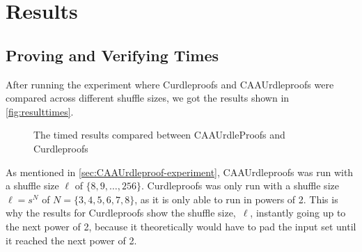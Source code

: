 \section{Results}\label{sec:results}
\subsection{Proving and Verifying Times}\label{subsec:results:provingverifying}

After running the experiment where Curdleproofs and CAAUrdleproofs were compared across different shuffle sizes, we got the results shown in \autoref{fig:resulttimes}.

\begin{figure}[!htb]
    \centering
    \qquad
    \caption{The timed results compared between CAAUrdleProofs and Curdleproofs}%
    \label{fig:resulttimes}%
\end{figure}

As mentioned in \autoref{sec:CAAUrdleproof-experiment}, CAAUrdleproofs was run with a shuffle size $\ell$ of $\{8,9,\dots,256\}$.
Curdleproofs was only run with a shuffle size $\ell = s^N$ of $N = \{3,4,5,6,7,8\}$, as it is only able to run in powers of 2.
This is why the results for Curdleproofs show the shuffle size,~$\ell$, instantly going up to the next power of 2, because it theoretically would have to pad the input set until it reached the next power of 2.

